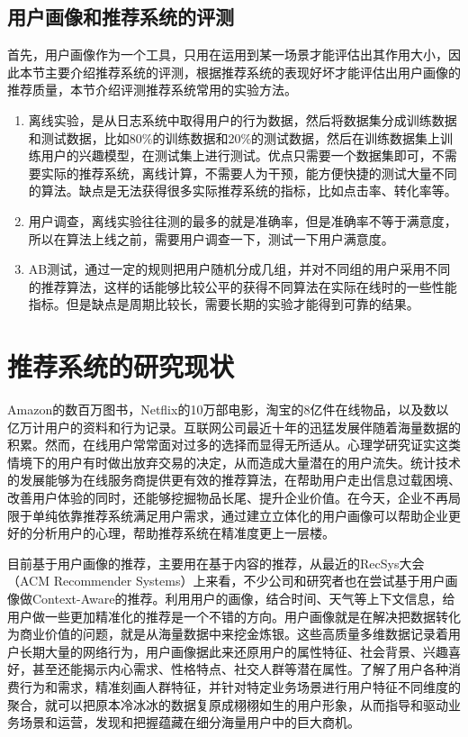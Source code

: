 		\subsection{用户画像和推荐系统的评测}
		首先，用户画像作为一个工具，只用在运用到某一场景才能评估出其作用大小，因此本节主要介绍推荐系统的评测，根据推荐系统的表现好坏才能评估出用户画像的推荐质量，本节介绍评测推荐系统常用的实验方法。
			\begin{enumerate}[(1)]
			\item 离线实验，是从日志系统中取得用户的行为数据，然后将数据集分成训练数据和测试数据，比如80\%的训练数据和20\%的测试数据，然后在训练数据集上训练用户的兴趣模型，在测试集上进行测试。优点只需要一个数据集即可，不需要实际的推荐系统，离线计算，不需要人为干预，能方便快捷的测试大量不同的算法。缺点是无法获得很多实际推荐系统的指标，比如点击率、转化率等。
			\item 用户调查，离线实验往往测的最多的就是准确率，但是准确率不等于满意度，所以在算法上线之前，需要用户调查一下，测试一下用户满意度。
			\item AB测试，通过一定的规则把用户随机分成几组，并对不同组的用户采用不同的推荐算法，这样的话能够比较公平的获得不同算法在实际在线时的一些性能指标。但是缺点是周期比较长，需要长期的实验才能得到可靠的结果。
			\end{enumerate}

	\section{推荐系统的研究现状}
	Amazon的数百万图书，Netflix的10万部电影，淘宝的8亿件在线物品，以及数以亿万计用户的资料和行为记录。互联网公司最近十年的迅猛发展伴随着海量数据的积累。然而，在线用户常常面对过多的选择而显得无所适从。心理学研究证实这类情境下的用户有时做出放弃交易的决定，从而造成大量潜在的用户流失。统计技术的发展能够为在线服务商提供更有效的推荐算法，在帮助用户走出信息过载困境、改善用户体验的同时，还能够挖掘物品长尾、提升企业价值。在今天，企业不再局限于单纯依靠推荐系统满足用户需求，通过建立立体化的用户画像可以帮助企业更好的分析用户的心理，帮助推荐系统在精准度更上一层楼。

	目前基于用户画像的推荐，主要用在基于内容的推荐，从最近的RecSys大会（ACM Recommender Systems）上来看，不少公司和研究者也在尝试基于用户画像做Context-Aware的推荐。利用用户的画像，结合时间、天气等上下文信息，给用户做一些更加精准化的推荐是一个不错的方向。用户画像就是在解决把数据转化为商业价值的问题，就是从海量数据中来挖金炼银。这些高质量多维数据记录着用户长期大量的网络行为，用户画像据此来还原用户的属性特征、社会背景、兴趣喜好，甚至还能揭示内心需求、性格特点、社交人群等潜在属性。了解了用户各种消费行为和需求，精准刻画人群特征，并针对特定业务场景进行用户特征不同维度的聚合，就可以把原本冷冰冰的数据复原成栩栩如生的用户形象，从而指导和驱动业务场景和运营，发现和把握蕴藏在细分海量用户中的巨大商机。

